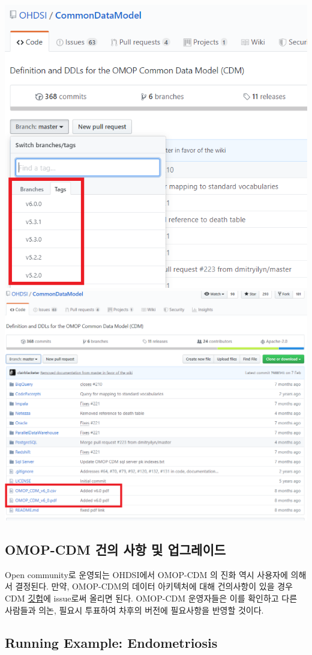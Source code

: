 \documentclass[]{book}
\begin{document}
\includegraphics[width=0.8\linewidth]{images/CommonDataModel/github_tags}
\includegraphics[width=0.8\linewidth]{images/CommonDataModel/github_pdf}

\hypertarget{omop-cdm----}{%
\subsection{OMOP-CDM 건의 사항 및 업그레이드}\label{omop-cdm----}}

Open community로 운영되는 OHDSI에서 OMOP-CDM 의 진화 역시 사용자에 의해서 결정된다. 만약, OMOP-CDM의 데이터 아키텍처에 대해 건의사항이 있을 경우 CDM \href{https://github.com/ohdsi/commondatamodel/issues}{깃헙}에 issue로써 올리면 된다. OMOP-CDM 운영자들은 이를 확인하고 다른 사람들과 의논, 필요시 투표하여 차후의 버전에 필요사항을 반영할 것이다.

\hypertarget{running-example-endometriosis}{%
\subsection{Running Example: Endometriosis}\label{running-example-endometriosis}}
\end{document}
